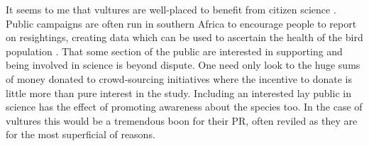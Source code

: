  \indent 
It seems to me that vultures are well-placed to benefit from citizen science \citep{silvertown2009new}. Public campaigns are often run in southern Africa to encourage people to report on resightings, creating data which can be used to ascertain the health of the bird population \citep{monadjem2014effect}. That some section of the public are interested in supporting and being involved in science is beyond dispute. One need only look to the huge sums of money donated to crowd-sourcing initiatives where the incentive to donate is little more than pure interest in the study. Including an interested lay public in science has the effect of promoting awareness about the species too. In the case of vultures this would be a tremendous boon for their PR, often reviled as they are for the most superficial of reasons.




